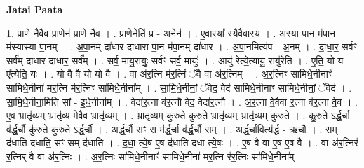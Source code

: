 \documentclass[17pt]{extarticle}
\begin{document}
\textbf{Jatai Paata} \newline

1. प्रा॒णे नै॒वैव प्रा॒णेन॑ प्रा॒णे नै॒व । . प्रा॒णेनेति॑ प्र - अ॒नेन॑ । . ए॒वास्या᳚ स्यै॒वैवास्य॑ । . अ॒स्या॒ पा॒न म॑पा॒न म॑स्यास्या पा॒नम् । . अ॒पा॒नम् दा॑धार दाधारा पा॒न म॑पा॒नम् दा॑धार । . अ॒पा॒नमित्य॑प - अ॒नम् । . दा॒धा॒र॒ सर्वꣳ॒॒ सर्व॑म् दाधार दाधार॒ सर्व᳚म् । . सर्व॒ मायु॒रायुः॒ सर्वꣳ॒॒ सर्व॒ मायुः॑ । . आयु॑ रेत्ये॒त्यायु॒ रायु॑रेति । . ए॒ति॒ यो य ए᳚त्येति॒ यः । . यो वै वै यो यो वै । . वा अ॑र॒त्नि म॑र॒त्निं ॅवै वा अ॑र॒त्निम् । . अ॒र॒त्निꣳ सा॑मिधे॒नीनाꣳ॑ सामिधे॒नीना॑ मर॒त्नि म॑र॒त्निꣳ सा॑मिधे॒नीना᳚म् । . सा॒मि॒धे॒नीनां॒ ॅवेद॒ वेद॑ सामिधे॒नीनाꣳ॑ सामिधे॒नीनां॒ ॅवेद॑ । . सा॒मि॒धे॒नीना॒मिति॑ सां - इ॒धे॒नीना᳚म् । . वेदा॑र॒त्ना व॑र॒त्नौ वेद॒ वेदा॑र॒त्नौ । . अ॒र॒त्ना वे॒वैवा र॒त्ना व॑र॒त्ना वे॒व । . ए॒व भ्रातृ॑व्य॒म् भ्रातृ॑व्य मे॒वैव भ्रातृ॑व्यम् । . भ्रातृ॑व्यम् कुरुते कुरुते॒ भ्रातृ॑व्य॒म् भ्रातृ॑व्यम् कुरुते । . कु॒रु॒ते॒ ऽर्द्ध॒र्चा व॑र्द्ध॒र्चौ कु॑रुते कुरुते ऽर्द्ध॒र्चौ । . अ॒र्द्ध॒र्चौ सꣳ स म॑र्द्ध॒र्चा व॑र्द्ध॒र्चौ सम् । . अ॒र्द्ध॒र्चावित्य॑र्द्ध - ऋ॒चौ । . सम् द॑धाति दधाति॒ सꣳ सम् द॑धाति । . द॒धा॒ त्ये॒ष ए॒ष द॑धाति दधा त्ये॒षः । . ए॒ष वै वा ए॒ष ए॒ष वै । . वा अ॑र॒त्निर॑ र॒त्निर् वै वा अ॑र॒त्निः । . अ॒र॒त्निः सा॑मिधे॒नीनाꣳ॑ सामिधे॒नीना॑ मर॒त्नि र॑र॒त्निः सा॑मिधे॒नीना᳚म् । \newline
\end{document}
